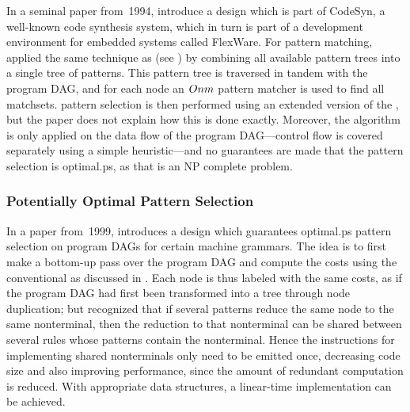 In a seminal paper from~1994, \citeauthor{Liem1994} introduce a design which is
part of \gls{CodeSyn}, a well-known code synthesis system, which in turn is part
of a development environment for embedded systems called \gls{FlexWare}.
%
For
\gls{pattern matching}, \citeauthor{Liem1994} applied the same technique as
\textcite{Weingart1973} (see
) by combining all
available \glspl{pattern tree} into a single \gls{tree} of \glspl{pattern}.
%
This
\gls{pattern tree} is traversed in tandem with the \gls{program DAG}, and for
each \gls{node} an \mbox{$O{nm}$} \gls{pattern matcher} is used to find all
\glspl{matchset}.
%
\Gls{pattern selection} is then performed using an extended
version of the \tDPalgorithm, but the paper does not explain how this is done
exactly.
%
Moreover, the algorithm is only applied on the data flow of the
\gls{program DAG}---control flow is covered separately using a simple
heuristic---and no guarantees are made that the \gls{pattern selection} is
\gls{optimal.ps}, as that is an \gls{NP complete} problem.


\subsubsection{Potentially Optimal Pattern Selection}

In a paper from~1999, \textcite{Ertl1999} introduces a design which guarantees
\gls{optimal.ps} \gls{pattern selection} on \glspl{program DAG} for certain
\glspl{machine grammar}.
%
The idea is to first make a bottom-up pass over
the \gls{program DAG} and compute the costs using the conventional \tDPalgorithm
as discussed in .
%
Each \gls{node} is thus labeled with
the same costs, as if the \gls{program DAG} had first been transformed into a
\gls{tree} through \gls{node} duplication; but \citeauthor{Ertl1999} recognized
that if several \glspl{pattern} reduce the same \gls{node} to the same
\gls{nonterminal}, then the reduction to that \gls{nonterminal} can be shared
between several \glspl{rule} whose \glspl{pattern} contain the
\gls{nonterminal}.
%
 Hence the \glspl{instruction} for implementing shared
\glspl{nonterminal} only need to be emitted once, decreasing code size and also
improving performance, since the amount of redundant computation is
reduced.
%
With appropriate data structures, a linear-time implementation can be
achieved.

